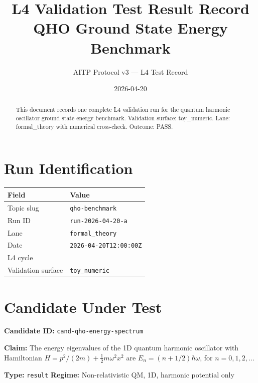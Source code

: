 \documentclass[11pt,a4paper]{article}
\title{\textbf{L4 Validation Test Result Record}\\[0.4em]
  \large QHO Ground State Energy Benchmark}
\author{AITP Protocol v3 — L4 Test Record}
\date{2026-04-20}
\begin{document}
\maketitle

\begin{abstract}
This document records one complete L4 validation run for the quantum harmonic
oscillator ground state energy benchmark. Validation surface: toy\_numeric.
Lane: formal\_theory with numerical cross-check. Outcome: PASS.
\end{abstract}

\tableofcontents
\newpage

\section{Run Identification}

\begin{infobox}
\begin{tabularx}{\linewidth}{@{}>{\raggedright\arraybackslash}p{3.5cm} >{\raggedright\arraybackslash}X@{}}
\toprule
\textbf{Field} & \textbf{Value} \\
\midrule
Topic slug       & \texttt{qho-benchmark} \\
Run ID           & \texttt{run-2026-04-20-a} \\
Lane             & \texttt{formal\_theory} \\
Date             & \texttt{2026-04-20T12:00:00Z} \\
L4 cycle         & 1 \\
Validation surface & \texttt{toy\_numeric} \\
\bottomrule
\end{tabularx}
\end{infobox}

\section{Candidate Under Test}

\begin{infobox}
\textbf{Candidate ID:} \texttt{cand-qho-energy-spectrum}

\textbf{Claim:} The energy eigenvalues of the 1D quantum harmonic oscillator
with Hamiltonian $H = p^2/(2m) + \frac{1}{2} m \omega^2 x^2$ are
$E_n = (n + 1/2) \hbar \omega$, for $n = 0, 1, 2, \ldots$

\textbf{Type:} \texttt{result} \quad
\textbf{Regime:} Non-relativistic QM, 1D, harmonic potential only
\end{infobox}
\end{document}
